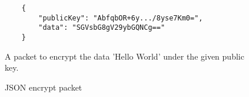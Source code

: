 \begin{figure}[H]
  \centering
  \begin{verbatim}
	{
		"publicKey": "AbfqbOR+6y.../8yse7Km0=",
		"data": "SGVsbG8gV29ybGQNCg=="
	}
  \end{verbatim}
  \caption{
  	JSON encrypt packet
  }{
  	A packet to encrypt the data 'Hello World' under the given public key.
  }
  \label{code:encrypt_data_json}
\end{figure}
